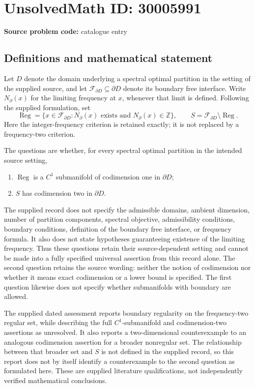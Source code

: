 \documentclass[11pt]{article}
\newcommand{\Z}{\mathbb{Z}}
\begin{document}
\section*{UnsolvedMath ID: 30005991}
\textbf{Source problem code:} catalogue entry
\subsection{Definitions and mathematical statement}
Let \(D\) denote the domain underlying a spectral optimal partition in the setting of the supplied source, and let \(\mathcal F_{\partial D}\subseteq\partial D\) denote its boundary free interface. Write \(N_{\partial}(x)\) for the limiting frequency at \(x\), whenever that limit is defined. Following the supplied formulation, set
\[
\operatorname{Reg}=\{x\in\mathcal F_{\partial D}:N_{\partial}(x)\text{ exists and }N_{\partial}(x)\in\Z\},
\qquad S=\mathcal F_{\partial D}\setminus\operatorname{Reg}.
\]
Here the integer-frequency criterion is retained exactly; it is not replaced by a frequency-two criterion.

The questions are whether, for every spectral optimal partition in the intended source setting,
\begin{enumerate}
\item \(\operatorname{Reg}\) is a \(C^1\) submanifold of codimension one in \(\partial D\);
\item \(S\) has codimension two in \(\partial D\).
\end{enumerate}
The supplied record does not specify the admissible domains, ambient dimension, number of partition components, spectral objective, admissibility conditions, boundary conditions, definition of the boundary free interface, or frequency formula. It also does not state hypotheses guaranteeing existence of the limiting frequency. Thus these questions retain their source-dependent setting and cannot be made into a fully specified universal assertion from this record alone. The second question retains the source wording: neither the notion of codimension nor whether it means exact codimension or a lower bound is specified. The first question likewise does not specify whether submanifolds with boundary are allowed.

The supplied dated assessment reports boundary regularity on the frequency-two regular set, while describing the full \(C^1\)-submanifold and codimension-two assertions as unresolved. It also reports a two-dimensional counterexample to an analogous codimension assertion for a broader nonregular set. The relationship between that broader set and \(S\) is not defined in the supplied record, so this report does not by itself identify a counterexample to the second question as formulated here. These are supplied literature qualifications, not independently verified mathematical conclusions.
\end{document}
